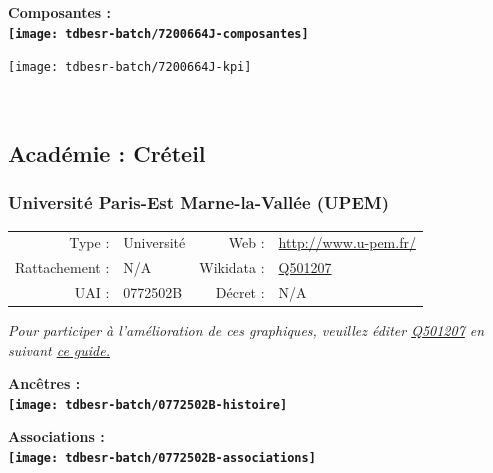 \documentclass[12pt,french,]{article}
\begin{document}
\hrulefill

\begin{center} \bf Composantes : \\  
\texttt{[image: tdbesr-batch/7200664J-composantes]} \end{center}

\begin{center}\texttt{[image: tdbesr-batch/7200664J-kpi]} \end{center}\checkoddpage

\ifoddpage \fi ~\newpage  

\hypertarget{acaduxe9mie-cruxe9teil}{%
\subsection{Académie : Créteil}\label{acaduxe9mie-cruxe9teil}}

\hypertarget{universituxe9-paris-est-marne-la-valluxe9e-upem}{%
\subsubsection{Université Paris-Est Marne-la-Vallée
(UPEM)}\label{universituxe9-paris-est-marne-la-valluxe9e-upem}}

\begin{tabular*}{\textwidth}{rp{5cm}rl}  
\hline  
Type : & Université & Web : &\href{http://www.u-pem.fr/}{http://www.u-pem.fr/} \\  
Rattachement : & N/A & Wikidata : & \href{https://www.wikidata.org/entity/Q501207}{Q501207} \\  
UAI : & 0772502B & Décret : & N/A \\  
\hline  
\end{tabular*}

\textit{\scriptsize Pour participer à l'amélioration de ces graphiques, veuillez éditer  \href{https://www.wikidata.org/entity/Q501207}{Q501207}  en suivant \href{https://github.com/cpesr/wikidataESR/blob/master/Rmd/wikidataESR.md}{ce guide.}}

\vspace{1cm}  
\begin{minipage}[b]{0.50\textwidth}\begin{center} \bf Ancêtres : \\  
\texttt{[image: tdbesr-batch/0772502B-histoire]} \end{center}\end{minipage}\begin{minipage}[b]{0.50\textwidth}\begin{center} \bf Associations : \\  
\texttt{[image: tdbesr-batch/0772502B-associations]} \end{center}\end{minipage}
\end{document}
